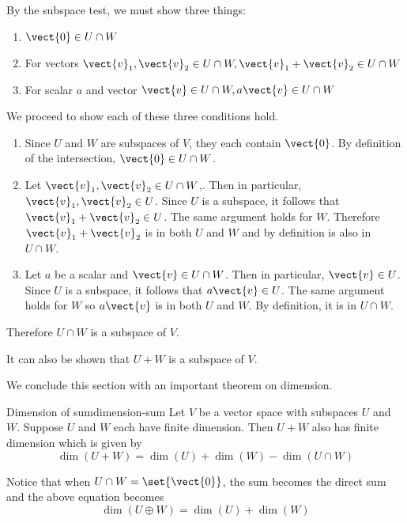 \begin{solution}
By the subspace test, we must show three things:
\begin{enumerate}
\item $\vect{0} \in U \cap W$
\item For vectors $\vect{v}_1, \vect{v}_2 \in U \cap W, \vect{v}_1+\vect{v}_2 \in U \cap W$
\item For scalar $a$ and vector $\vect{v} \in U \cap W, a\vect{v} \in U \cap W$
\end{enumerate}

We proceed to show each of these three conditions hold.
\begin{enumerate}
\item
Since $U$ and $W$ are subspaces of $V$, they each contain $\vect{0}$. By definition of the intersection, $\vect{0} \in U \cap W$.

\item
Let  $\vect{v}_1, \vect{v}_2 \in U \cap W$,. Then in particular,  $\vect{v}_1, \vect{v}_2 \in U$. Since $U$ is a subspace, it follows that $ \vect{v}_1+\vect{v}_2 \in U$. The same argument holds for $W$. Therefore $\vect{v}_1+\vect{v}_2$ is in both $U$ and $W$ and by definition is also in $U \cap W$.

\item
Let $a$ be a scalar and $\vect{v} \in U \cap W$. Then in particular, $\vect{v} \in U$. Since $U$ is a subspace, it follows that $a \vect{v} \in U$. The same argument holds for $W$ so $a\vect{v}$ is in both $U$ and $W$. By definition, it is in $U \cap W$.
\end{enumerate}

Therefore $U \cap W$ is a subspace of $V$.
\end{solution}

It can also be shown that $U + W$ is a subspace of $V$.

We conclude this section with an important theorem on dimension.

\begin{theorem}{Dimension of sum}{dimension-sum}
Let $V$ be a vector space with subspaces $U$ and $W$. Suppose $U$ and $W$ each have finite dimension. Then $U + W$ also has finite dimension which is given by\[
\dim (U+W) = \dim(U) + \dim(W) - \dim (U \cap W)
\]
\end{theorem}

Notice that when $U \cap W = \set{\vect{0} }$, the sum becomes the direct sum and the above equation becomes
\[
\dim (U \oplus W) = \dim(U) + \dim(W)
\]
